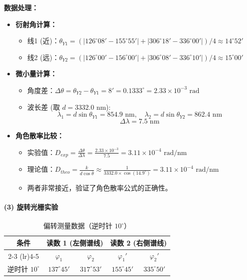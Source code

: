 \documentclass[]{../../templates/Report}%
\begin{document}
\begin{fullreportonly}
\textbf{数据处理：}
\begin{itemize}
    \item \textbf{衍射角计算：}
    \begin{itemize}
        \item 线1 (近)：$\theta_{Y1} = (|126^\circ 08' - 155^\circ 55'| + |306^\circ 18' - 336^\circ 00'|)/4 \approx 14^\circ 52'$
        \item 线2 (远)：$\theta_{Y2} = (|126^\circ 00' - 156^\circ 00'| + |306^\circ 08' - 336^\circ 10'|)/4 \approx 15^\circ 00'$
    \end{itemize}
    \item \textbf{微小量计算：}
    \begin{itemize}
        \item 角度差：$\Delta \theta = \theta_{Y2} - \theta_{Y1} = 8' = 0.1333^\circ = 2.33 \times 10^{-3} \text{ rad}$
        \item 波长差 (取 $d=3332.0 \text{ nm}$):
        \[
        \lambda_1 = d \sin \theta_{Y1} = 854.9 \text{ nm}, \quad \lambda_2 = d \sin \theta_{Y2} = 862.4 \text{ nm}
        \]
        \[
        \Delta \lambda = 7.5 \text{ nm}
        \]
    \end{itemize}
    \item \textbf{角色散率比较：}
    \begin{itemize}
        \item 实验值：$D_{exp} = \frac{\Delta \theta}{\Delta \lambda} = \frac{2.33 \times 10^{-3}}{7.5} = 3.11 \times 10^{-4} \text{ rad/nm}$
        \item 理论值：$D_{theo} = \frac{k}{d \cos \bar{\theta}} \approx \frac{1}{3332.0 \times \cos(14.9^\circ)} = 3.11 \times 10^{-4} \text{ rad/nm}$
        \item 两者非常接近，验证了角色散率公式的正确性。
    \end{itemize}
\end{itemize}

\paragraph{(3) 旋转光栅实验} \mbox{}
\begin{table}[H]
    \centering
    \caption{偏转测量数据（逆时针 $10^\circ$）}
    \begin{tabular}{ccccc}
        \toprule
        \multirow{2}{*}{条件} & \multicolumn{2}{c}{读数 1 (左侧谱线)} & \multicolumn{2}{c}{读数 2 (右侧谱线)} \\
        \cmidrule(lr){2-3} \cmidrule(lr){4-5}
         & $\varphi_1$ & $\varphi_2$ & $\varphi_1'$ & $\varphi_2'$ \\
        \midrule
        逆时针 $10^\circ$ & $137^\circ 45'$ & $317^\circ 53'$ & $155^\circ 45'$ & $335^\circ 50'$ \\
        \bottomrule
    \end{tabular}
\end{table}


\end{fullreportonly}
\end{document}
